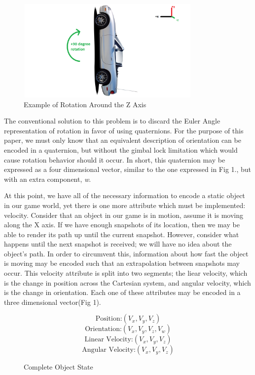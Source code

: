 \documentclass[conference]{IEEEtran}
\begin{document}
\begin{figure}[htbp]
\centerline{\includegraphics [width = 9cm, height = 5cm] {fig2.png}}
\caption{Example of Rotation Around the Z Axis}
\end{figure}

The conventional solution to this problem is to discard the Euler Angle representation of rotation in favor of using quaternions.
For the purpose of this paper, we must only know that an equivalent description of orientation can be encoded in a quaternion,
but without the gimbal lock limitation which would cause rotation behavior should it occur. In short, this quaternion may be expressed as a four dimensional
vector, similar to the one expressed in Fig 1., but with an extra component, \textit{w}.

At this point, we have all of the necessary information to encode a static object in our game world, yet there is one more attribute which
must be implemented: velocity. Consider that an object in our game is in motion, assume it is moving along the X axis. If we have enough snapshots of its location,
then we may be able to render its path up until the current snapshot. However, consider what happens until the next snapshot is received; we will have no idea about the object's path.
In order to circumvent this, information about how fast the object is moving may be encoded such that an extrapolation between snapshots may occur. This velocity attribute
is split into two segments; the liear velocity, which is the change in position across the Cartesian system, and angular velocity, which is the change in orientation.
Each one of these attributes may be encoded in a three dimensional vector(Fig 1).

\begin{figure}[htbp]
\begin{equation}
\text {Position:} (V_{x}, V_{y}, V_{z})
\end{equation}
\begin{equation}
\text {Orientation:} (V_{x}, V_{y}, V_{z}, V_{w})
\end{equation}
\begin{equation}
\text {Linear Velocity:} (V_{x}, V_{y}, V_{z})
\end{equation}
\begin{equation}
\text {Angular Velocity:} (V_{x}, V_{y}, V_{z})
\end{equation}
\caption{Complete Object State}
\end{figure}
\end{document}
